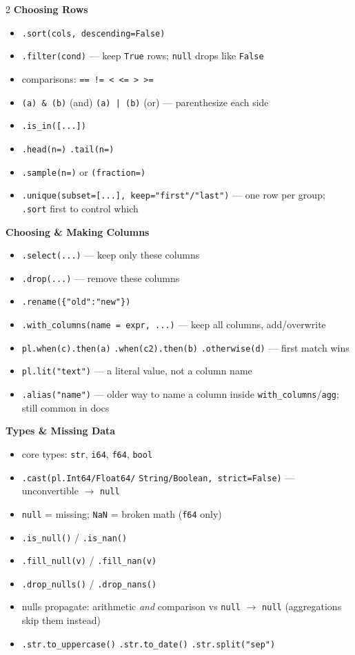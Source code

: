 \documentclass[11pt, a4paper]{article}
\newcommand{\code}[1]{\textcolor{codecolor}{\texttt{#1}}}
\newcommand{\head}[1]{\smallskip\textbf{#1}\par\smallskip}
\begin{document}
\begin{multicols}{2}
\head{Choosing Rows}
\begin{itemize}
  \item \code{.sort(cols, descending=False)}
  \item \code{.filter(cond)} --- keep \code{True} rows; \code{null} drops like \code{False}
  \item comparisons: \code{== != < <= > >=}
  \item \code{(a) \& (b)} (and) \code{(a) | (b)} (or) --- parenthesize each side
  \item \code{.is\_in([...])}
  \item \code{.head(n=)} \code{.tail(n=)}
  \item \code{.sample(n=)} or \code{(fraction=)}
  \item \code{.unique(subset=[...], keep="first"/"last")} --- one row per group; \code{.sort} first to control which
\end{itemize}

\head{Choosing \& Making Columns}
\begin{itemize}
  \item \code{.select(...)} --- keep only these columns
  \item \code{.drop(...)} --- remove these columns
  \item \code{.rename(\{"old":"new"\})}
  \item \code{.with\_columns(name = expr, ...)} --- keep all columns, add/overwrite
  \item \code{pl.when(c).then(a)} \code{.when(c2).then(b)} \code{.otherwise(d)} --- first match wins
  \item \code{pl.lit("text")} --- a literal value, not a column name
  \item \code{.alias("name")} --- older way to name a column inside \code{with\_columns}/\code{agg}; still common in docs
\end{itemize}

\head{Types \& Missing Data}
\begin{itemize}
  \item core types: \code{str}, \code{i64}, \code{f64}, \code{bool}
  \item \code{.cast(pl.Int64/Float64/} \code{String/Boolean, strict=False)} --- unconvertible $\to$ \code{null}
  \item \code{null} = missing; \code{NaN} = broken math (\code{f64} only)
  \item \code{.is\_null()} / \code{.is\_nan()}
  \item \code{.fill\_null(v)} / \code{.fill\_nan(v)}
  \item \code{.drop\_nulls()} / \code{.drop\_nans()}
  \item nulls propagate: arithmetic \emph{and} comparison vs \code{null} $\to$ \code{null} (aggregations skip them instead)
  \item \code{.str.to\_uppercase()} \code{.str.to\_date()} \code{.str.split("sep")}
\end{itemize}


\end{multicols}
\end{document}
